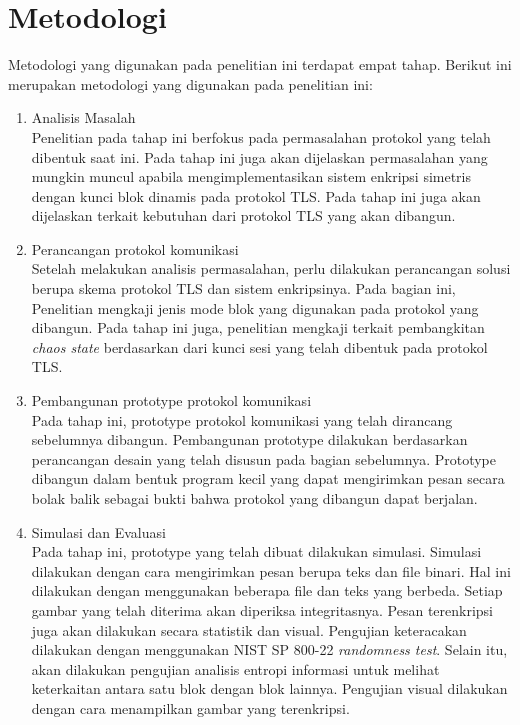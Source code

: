\section{Metodologi}
Metodologi yang digunakan pada penelitian ini terdapat empat tahap. Berikut ini merupakan metodologi yang digunakan pada penelitian ini:
\begin{enumerate}
  \item Analisis Masalah\\
  Penelitian pada tahap ini berfokus pada permasalahan protokol yang telah dibentuk saat ini. Pada tahap ini juga akan dijelaskan permasalahan yang mungkin muncul apabila mengimplementasikan sistem enkripsi simetris dengan kunci blok dinamis pada protokol TLS. Pada tahap ini juga akan dijelaskan terkait kebutuhan dari protokol TLS yang akan dibangun.

  \item Perancangan protokol komunikasi\\
  Setelah melakukan analisis permasalahan, perlu dilakukan perancangan solusi berupa skema protokol TLS dan sistem enkripsinya. Pada bagian ini, Penelitian mengkaji jenis mode blok yang digunakan pada protokol yang dibangun. Pada tahap ini juga, penelitian mengkaji terkait pembangkitan \emph{chaos state} berdasarkan dari kunci sesi yang telah dibentuk pada protokol TLS.

  \item Pembangunan prototype protokol komunikasi\\
  Pada tahap ini, prototype protokol komunikasi yang telah dirancang sebelumnya dibangun. Pembangunan prototype dilakukan berdasarkan perancangan desain yang telah disusun pada bagian sebelumnya. Prototype dibangun dalam bentuk program kecil yang dapat mengirimkan pesan secara bolak balik sebagai bukti bahwa protokol yang dibangun dapat berjalan.

  \item Simulasi dan Evaluasi\\
  Pada tahap ini, prototype yang telah dibuat dilakukan simulasi. Simulasi dilakukan dengan cara mengirimkan pesan berupa teks dan file binari. Hal ini dilakukan dengan menggunakan beberapa file dan teks yang berbeda. Setiap gambar yang telah diterima akan diperiksa integritasnya. Pesan terenkripsi juga akan dilakukan secara statistik dan visual. Pengujian keteracakan dilakukan dengan menggunakan NIST SP 800-22 \emph{randomness test}. Selain itu, akan dilakukan pengujian analisis entropi informasi untuk melihat keterkaitan antara satu blok dengan blok lainnya. Pengujian visual dilakukan dengan cara menampilkan gambar yang terenkripsi.
\end{enumerate}

